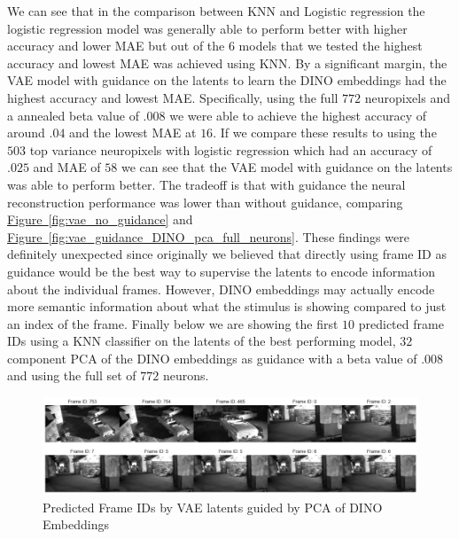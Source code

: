 \documentclass[12pt, letterpaper]{article}
\begin{document}
We can see that in the comparison between KNN and Logistic regression the logistic regression model was generally able to perform better with higher accuracy and lower MAE but out of the $6$ models that we tested the highest accuracy and lowest MAE was achieved using KNN. By a significant margin, the VAE model with guidance on the latents to learn the DINO \cite{dino} embeddings had the highest accuracy and lowest MAE. Specifically, using the full $772$ neuropixels and a annealed beta value of $.008$ we were able to achieve the highest accuracy of around $.04$ and the lowest MAE at $16$. If we compare these results to using the $503$ top variance neuropixels with logistic regression which had an accuracy of $.025$ and MAE of $58$ we can see that the VAE model with guidance on the latents was able to perform better. The tradeoff is that with guidance the neural reconstruction performance was lower than without guidance, comparing \hyperref[fig:vae_no_guidance]{Figure~\ref{fig:vae_no_guidance}} and \hyperref[fig:vae_guidance_DINO_pca_full_neurons]{Figure~\ref{fig:vae_guidance_DINO_pca_full_neurons}}. These findings were definitely unexpected since originally we believed that directly using frame ID as guidance would be the best way to supervise the latents to encode information about the individual frames. However, DINO \cite{dino} embeddings may actually encode more semantic information about what the stimulus is showing compared to just an index of the frame. Finally below we are showing the first $10$ predicted frame IDs using a KNN classifier on the latents of the best performing model, $32$ component PCA of the DINO \cite{dino} embeddings as guidance with a beta value of $.008$ and using the full set of $772$ neurons.

\begin{figure}[H]
    \centering
    \includegraphics[width=1.0\textwidth]{772_vae_hidden_.9_pca_DINO_knn_video.png}
    \caption{Predicted Frame IDs by VAE latents guided by PCA of DINO Embeddings}
    \label{fig:vae_frame_id_decoded_video}
\end{figure}
\end{document}
